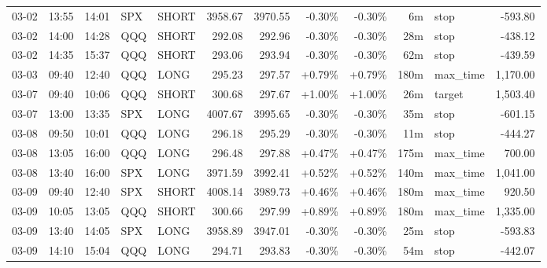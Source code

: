 \documentclass[11pt,a4paper]{article}
\begin{document}
\begin{center}
\begin{longtable}{>{\color{txtmain}}l l l l l r r r r r >{\color{txtmain}}l r}
03-02 & 13:55 & 14:01 & SPX & SHORT & 3958.67 & 3970.55 & \textcolor{lossred}{-0.30\%} & \textcolor{lossred}{-0.30\%} & 6m & stop & \textcolor{lossred}{-593.80} \\
03-02 & 14:00 & 14:28 & QQQ & SHORT & 292.08 & 292.96 & \textcolor{lossred}{-0.30\%} & \textcolor{lossred}{-0.30\%} & 28m & stop & \textcolor{lossred}{-438.12} \\
03-02 & 14:35 & 15:37 & QQQ & SHORT & 293.06 & 293.94 & \textcolor{lossred}{-0.30\%} & \textcolor{lossred}{-0.30\%} & 62m & stop & \textcolor{lossred}{-439.59} \\
03-03 & 09:40 & 12:40 & QQQ & LONG & 295.23 & 297.57 & \textcolor{wingreen}{+0.79\%} & \textcolor{wingreen}{+0.79\%} & 180m & max\_time & \textcolor{wingreen}{1,170.00} \\
03-07 & 09:40 & 10:06 & QQQ & SHORT & 300.68 & 297.67 & \textcolor{wingreen}{+1.00\%} & \textcolor{wingreen}{+1.00\%} & 26m & target & \textcolor{wingreen}{1,503.40} \\
03-07 & 13:00 & 13:35 & SPX & LONG & 4007.67 & 3995.65 & \textcolor{lossred}{-0.30\%} & \textcolor{lossred}{-0.30\%} & 35m & stop & \textcolor{lossred}{-601.15} \\
03-08 & 09:50 & 10:01 & QQQ & LONG & 296.18 & 295.29 & \textcolor{lossred}{-0.30\%} & \textcolor{lossred}{-0.30\%} & 11m & stop & \textcolor{lossred}{-444.27} \\
03-08 & 13:05 & 16:00 & QQQ & LONG & 296.48 & 297.88 & \textcolor{wingreen}{+0.47\%} & \textcolor{wingreen}{+0.47\%} & 175m & max\_time & \textcolor{wingreen}{700.00} \\
03-08 & 13:40 & 16:00 & SPX & LONG & 3971.59 & 3992.41 & \textcolor{wingreen}{+0.52\%} & \textcolor{wingreen}{+0.52\%} & 140m & max\_time & \textcolor{wingreen}{1,041.00} \\
03-09 & 09:40 & 12:40 & SPX & SHORT & 4008.14 & 3989.73 & \textcolor{wingreen}{+0.46\%} & \textcolor{wingreen}{+0.46\%} & 180m & max\_time & \textcolor{wingreen}{920.50} \\
03-09 & 10:05 & 13:05 & QQQ & SHORT & 300.66 & 297.99 & \textcolor{wingreen}{+0.89\%} & \textcolor{wingreen}{+0.89\%} & 180m & max\_time & \textcolor{wingreen}{1,335.00} \\
03-09 & 13:40 & 14:05 & SPX & LONG & 3958.89 & 3947.01 & \textcolor{lossred}{-0.30\%} & \textcolor{lossred}{-0.30\%} & 25m & stop & \textcolor{lossred}{-593.83} \\
03-09 & 14:10 & 15:04 & QQQ & LONG & 294.71 & 293.83 & \textcolor{lossred}{-0.30\%} & \textcolor{lossred}{-0.30\%} & 54m & stop & \textcolor{lossred}{-442.07} \\

\end{longtable}
\end{center}
\end{document}
